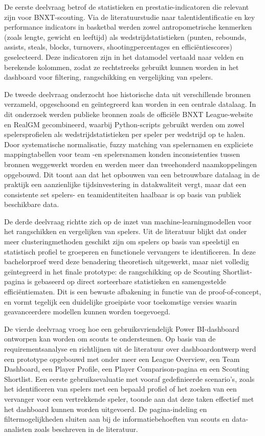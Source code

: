 De eerste deelvraag betrof de statistieken en prestatie-indicatoren die relevant zijn voor BNXT-scouting. Via de literatuurstudie naar talentidentificatie en key performance indicators in basketbal werden zowel antropometrische kenmerken (zoals lengte, gewicht en leeftijd) als wedstrijdstatistieken (punten, rebounds, assists, steals, blocks, turnovers, shootingpercentages en efficiëntiescores) geselecteerd. Deze indicatoren zijn in het datamodel vertaald naar velden en berekende kolommen, zodat ze rechtstreeks gebruikt kunnen worden in het dashboard voor filtering, rangschikking en vergelijking van spelers.

De tweede deelvraag onderzocht hoe historische data uit verschillende bronnen verzameld, opgeschoond en geïntegreerd kan worden in een centrale datalaag. In dit onderzoek werden publieke bronnen zoals de officiële BNXT League-website en RealGM gecombineerd, waarbij Python-scripts gebruikt werden om zowel spelersprofielen als wedstrijdstatistieken per speler per wedstrijd op te halen. Door systematische normalisatie, fuzzy matching van spelernamen en expliciete mappingtabellen voor team -en spelersnamen konden inconsistenties tussen bronnen weggewerkt worden en werden meer dan tweehonderd naamkoppelingen opgebouwd. Dit toont aan dat het opbouwen van een betrouwbare datalaag in de praktijk een aanzienlijke tijdsinvestering in datakwaliteit vergt, maar dat een consistente set spelers- en teamidentiteiten haalbaar is op basis van publiek beschikbare data.

De derde deelvraag richtte zich op de inzet van machine-learningmodellen voor het rangschikken en vergelijken van spelers. Uit de literatuur blijkt dat onder meer clusteringmethoden geschikt zijn om spelers op basis van speelstijl en statistisch profiel te groeperen en functionele vervangers te identificeren. In deze bachelorproef werd deze benadering theoretisch uitgewerkt, maar niet volledig geïntegreerd in het finale prototype: de rangschikking op de Scouting Shortlist-pagina is gebaseerd op direct sorteerbare statistieken en samengestelde efficiëntiematen. Dit is een bewuste afbakening in functie van de proof-of-concept, en vormt tegelijk een duidelijke groeipiste voor toekomstige versies waarin geavanceerdere modellen kunnen worden toegevoegd.

De vierde deelvraag vroeg hoe een gebruiksvriendelijk Power BI-dashboard ontworpen kan worden om scouts te ondersteunen. Op basis van de requirementsanalyse en richtlijnen uit de literatuur over dashboardontwerp werd een prototype opgebouwd met onder meer een League Overview, een Team Dashboard, een Player Profile, een Player Comparison-pagina en een Scouting Shortlist. Een eerste gebruiksevaluatie met vooraf gedefinieerde scenario's, zoals het identificeren van spelers met een bepaald profiel of het zoeken van een vervanger voor een vertrekkende speler, toonde aan dat deze taken effectief met het dashboard kunnen worden uitgevoerd. De pagina-indeling en filtermogelijkheden sluiten aan bij de informatiebehoeften van scouts en data-analisten zoals beschreven in de literatuur.

